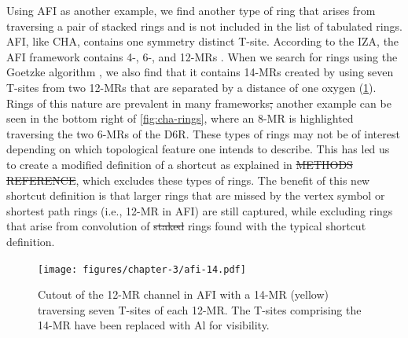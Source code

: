 \documentclass[preprint,numrefs,noinfo,sort&compress]{elsarticle}
\providecommand{\DIFadd}[1]{{\protect\color{blue}\uwave{#1}}} %
\providecommand{\DIFdel}[1]{{\protect\color{red}\sout{#1}}}                      %
\providecommand{\DIFaddbegin}{} %
\providecommand{\DIFaddend}{} %
\providecommand{\DIFdelbegin}{} %
\providecommand{\DIFdelend}{} %
\providecommand{\DIFaddbeginFL}{} %
\providecommand{\DIFaddendFL}{} %
\providecommand{\DIFdelbeginFL}{} %
\providecommand{\DIFdelendFL}{} %
\newcommand{\DIFscaledelfig}{0.5}
\newlength{\DIFdelgraphicswidth} %
\newlength{\DIFdelgraphicsheight} %
\newcommand{\DIFaddincludegraphics}[2][]{{\color{blue}\fbox{\DIFOincludegraphics[#1]{#2}}}} %
\newcommand{\DIFdelincludegraphics}[2][]{%
\sbox{\DIFdelgraphicsbox}{\DIFOincludegraphics[#1]{#2}}%
\settoboxwidth{\DIFdelgraphicswidth}{\DIFdelgraphicsbox} %
\settoboxtotalheight{\DIFdelgraphicsheight}{\DIFdelgraphicsbox} %
\scalebox{\DIFscaledelfig}{%
\parbox[b]{\DIFdelgraphicswidth}{\usebox{\DIFdelgraphicsbox}\\[-\baselineskip] \rule{\DIFdelgraphicswidth}{0em}}\llap{\resizebox{\DIFdelgraphicswidth}{\DIFdelgraphicsheight}{%
\setlength{\unitlength}{\DIFdelgraphicswidth}%
\begin{picture}(1,1)%
\thicklines\linethickness{2pt} %
{\color[rgb]{1,0,0}\put(0,0){\framebox(1,1){}}}%
{\color[rgb]{1,0,0}\put(0,0){\line( 1,1){1}}}%
{\color[rgb]{1,0,0}\put(0,1){\line(1,-1){1}}}%
\end{picture}%
}\hspace*{3pt}}} %
} %
\DeclareRobustCommand{\DIFaddbegin}{\DIFOaddbegin \let\includegraphics\DIFaddincludegraphics} %
\DeclareRobustCommand{\DIFaddend}{\DIFOaddend \let\includegraphics\DIFOincludegraphics} %
\DeclareRobustCommand{\DIFdelbegin}{\DIFOdelbegin \let\includegraphics\DIFdelincludegraphics} %
\DeclareRobustCommand{\DIFdelend}{\DIFOaddend \let\includegraphics\DIFOincludegraphics} %
\DeclareRobustCommand{\DIFaddbeginFL}{\DIFOaddbeginFL \let\includegraphics\DIFaddincludegraphics} %
\DeclareRobustCommand{\DIFaddendFL}{\DIFOaddendFL \let\includegraphics\DIFOincludegraphics} %
\DeclareRobustCommand{\DIFdelbeginFL}{\DIFOdelbeginFL \let\includegraphics\DIFdelincludegraphics} %
\DeclareRobustCommand{\DIFdelendFL}{\DIFOaddendFL \let\includegraphics\DIFOincludegraphics} %
\begin{document}
Using AFI as another example, we find another type of ring that arises from traversing a pair of stacked rings and is not included in the list of tabulated rings. AFI, like CHA, contains one symmetry distinct T-site. According to the IZA, the AFI framework contains 4-, 6-, and 12-MRs \cite{baerlocher-database-nodate}. When we search for rings using the Goetzke algorithm \cite{goetzke-properties-1991}, we also find that it contains 14-MRs created by using seven T-sites from two 12-MRs that are separated by a distance of one oxygen (\cref{fig:afi-14}). Rings of this nature are prevalent in many frameworks\DIFdelbegin \DIFdel{, }\DIFdelend \DIFaddbegin \DIFadd{; }\DIFaddend another example can be seen in the bottom right of \cref{fig:cha-rings}, where an 8-MR is highlighted traversing the two 6-MRs of the D6R. These types of rings may not be of interest depending on which topological feature one intends to describe. This has led us to create a modified definition of a shortcut as explained in \DIFdelbegin \DIFdel{METHODS REFERENCE}\DIFdelend \DIFaddbegin \DIFadd{\mbox{%
\cref{section:modified}}\hskip0pt%
}\DIFaddend , which excludes these types of rings. The benefit of this new shortcut definition is that larger rings that are missed by the vertex symbol or shortest path rings (i.e., 12-MR in AFI) are still captured, while excluding rings that arise from convolution of \DIFdelbegin \DIFdel{staked }\DIFdelend \DIFaddbegin \DIFadd{stacked }\DIFaddend rings found with the typical shortcut definition.

\DIFdelbegin %
\DIFdelendFL \DIFaddbeginFL \begin{figure}[t]
\DIFaddendFL \centering
\DIFdelbeginFL %
\DIFdelendFL \DIFaddbeginFL \texttt{[image: figures/chapter-3/afi-14.pdf]}
\DIFaddendFL \caption{Cutout of the 12-MR channel in AFI with a 14-MR (yellow) traversing seven T-sites of each 12-MR. The T-sites comprising the 14-MR have been replaced with Al for visibility. \label{fig:afi-14}}
\end{figure}
\DIFdelbegin %
\DIFdelend 
\end{document}
